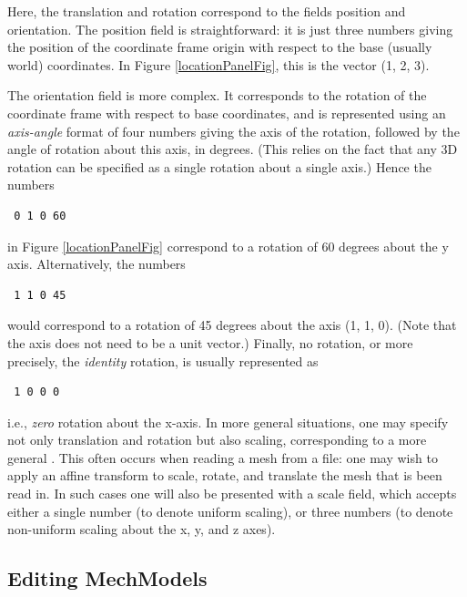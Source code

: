 \documentclass{article}
\begin{document}
Here, the translation
and rotation correspond to the fields {\sf position} and
{\sf orientation}. The {\sf position} field is straightforward: it is just three
numbers giving the position of the coordinate frame origin with
respect to the base (usually world) coordinates. In Figure \ref{locationPanelFig},
this is the vector (1, 2, 3).

The {\sf orientation} field is more complex. It corresponds to the rotation
of the coordinate frame with respect to base coordinates, and is
represented using an {\it axis-angle} format of four numbers giving the
axis of the rotation, followed by the angle of rotation about this
axis, in degrees.  (This relies on the fact that any 3D rotation can
be specified as a single rotation about a single axis.)  Hence the
numbers

\begin{verbatim}
 0 1 0 60
\end{verbatim}

in Figure \ref{locationPanelFig} correspond to a rotation of 60 degrees about
the y axis. Alternatively, the numbers

\begin{verbatim}
 1 1 0 45
\end{verbatim}

would correspond to a rotation of 45 degrees about the axis (1, 1, 0).
(Note that the axis does not need to be a unit vector.)
Finally, no rotation, or more precisely, the {\it identity} rotation,
is usually represented as

\begin{verbatim}
 1 0 0 0
\end{verbatim}

i.e., {\it zero} rotation about the x-axis. In more general situations,
one may specify not only translation and rotation but also scaling,
corresponding to a more general
. This often occurs when
reading a mesh from a file: one may wish to apply an affine transform
to scale, rotate, and translate the mesh that is been read in.  In
such cases one will also be presented with a {\sf scale} field, which
accepts either a single number (to denote uniform scaling), or three
numbers (to denote non-uniform scaling about the x, y, and z axes).

\subsection{Editing MechModels}
\end{document}
